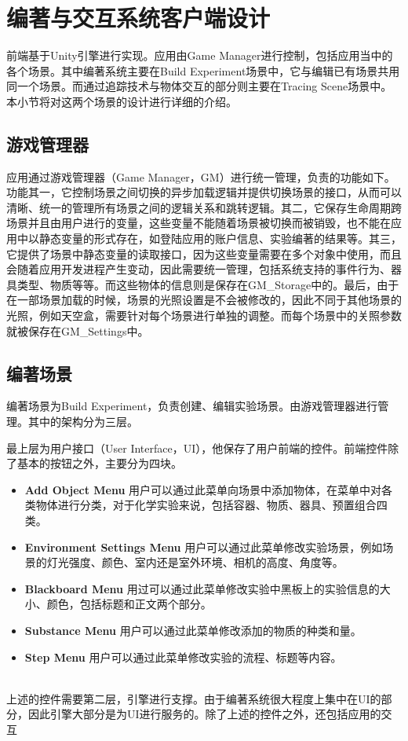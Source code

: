 \section{编著与交互系统客户端设计}
前端基于Unity引擎进行实现。应用由Game Manager进行控制，包括应用当中的各个场景。其中编著系统主要在Build Experiment场景中，它与编辑已有场景共用同一个场景。而通过追踪技术与物体交互的部分则主要在Tracing Scene场景中。本小节将对这两个场景的设计进行详细的介绍。

\subsection{游戏管理器}
应用通过游戏管理器（Game Manager，GM）进行统一管理，负责的功能如下。
功能其一，它控制场景之间切换的异步加载逻辑并提供切换场景的接口，从而可以清晰、统一的管理所有场景之间的逻辑关系和跳转逻辑。其二，它保存生命周期跨场景并且由用户进行的变量，这些变量不能随着场景被切换而被销毁，也不能在应用中以静态变量的形式存在，如登陆应用的账户信息、实验编著的结果等。其三，它提供了场景中静态变量的读取接口，因为这些变量需要在多个对象中使用，而且会随着应用开发进程产生变动，因此需要统一管理，包括系统支持的事件行为、器具类型、物质等等。而这些物体的信息则是保存在GM\_Storage中的。最后，由于在一部场景加载的时候，场景的光照设置是不会被修改的，因此不同于其他场景的光照，例如天空盒，需要针对每个场景进行单独的调整。而每个场景中的关照参数就被保存在GM\_Settings中。

\subsection{编著场景}
编著场景为Build Experiment，负责创建、编辑实验场景。由游戏管理器进行管理。其中的架构分为三层。

最上层为用户接口（User Interface，UI），他保存了用户前端的控件。前端控件除了基本的按钮之外，主要分为四块。

\begin{itemize}
    \item \textbf{Add Object Menu}
用户可以通过此菜单向场景中添加物体，在菜单中对各类物体进行分类，对于化学实验来说，包括容器、物质、器具、预置组合四类。
    
    \item \textbf{Environment Settings Menu}
用户可以通过此菜单修改实验场景，例如场景的灯光强度、颜色、室内还是室外环境、相机的高度、角度等。
    
    \item \textbf{Blackboard Menu}
用过可以通过此菜单修改实验中黑板上的实验信息的大小、颜色，包括标题和正文两个部分。

    \item \textbf{Substance Menu}
用户可以通过此菜单修改添加的物质的种类和量。

    \item \textbf{Step Menu}
用户可以通过此菜单修改实验的流程、标题等内容。
\end{itemize}
~\\
\indent    	上述的控件需要第二层，引擎进行支撑。由于编著系统很大程度上集中在UI的部分，因此引擎大部分是为UI进行服务的。除了上述的控件之外，还包括应用的交互

